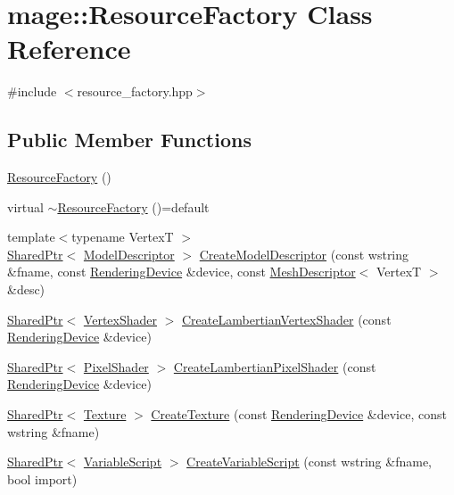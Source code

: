 \hypertarget{classmage_1_1_resource_factory}{}\section{mage\+:\+:Resource\+Factory Class Reference}
\label{classmage_1_1_resource_factory}


{\ttfamily \#include $<$resource\+\_\+factory.\+hpp$>$}

\subsection*{Public Member Functions}
\begin{DoxyCompactItemize}
\item 
\hyperlink{classmage_1_1_resource_factory_a340bde81096427e319b60063ae771a0d}{Resource\+Factory} ()
\item 
virtual \hyperlink{classmage_1_1_resource_factory_a07b50ac86226772e3c7d119ff9e10043}{$\sim$\+Resource\+Factory} ()=default
\item 
{\footnotesize template$<$typename VertexT $>$ }\\\hyperlink{namespacemage_a1e01ae66713838a7a67d30e44c67703e}{Shared\+Ptr}$<$ \hyperlink{classmage_1_1_model_descriptor}{Model\+Descriptor} $>$ \hyperlink{classmage_1_1_resource_factory_a04e226be9c659dc33d263dc82a2a1a30}{Create\+Model\+Descriptor} (const wstring \&fname, const \hyperlink{classmage_1_1_rendering_device}{Rendering\+Device} \&device, const \hyperlink{structmage_1_1_mesh_descriptor}{Mesh\+Descriptor}$<$ VertexT $>$ \&desc)
\item 
\hyperlink{namespacemage_a1e01ae66713838a7a67d30e44c67703e}{Shared\+Ptr}$<$ \hyperlink{classmage_1_1_vertex_shader}{Vertex\+Shader} $>$ \hyperlink{classmage_1_1_resource_factory_af5771b81adf517c1ff174252994e02b9}{Create\+Lambertian\+Vertex\+Shader} (const \hyperlink{classmage_1_1_rendering_device}{Rendering\+Device} \&device)
\item 
\hyperlink{namespacemage_a1e01ae66713838a7a67d30e44c67703e}{Shared\+Ptr}$<$ \hyperlink{classmage_1_1_pixel_shader}{Pixel\+Shader} $>$ \hyperlink{classmage_1_1_resource_factory_aa547e0dac336a2ac48eb92d399d929be}{Create\+Lambertian\+Pixel\+Shader} (const \hyperlink{classmage_1_1_rendering_device}{Rendering\+Device} \&device)
\item 
\hyperlink{namespacemage_a1e01ae66713838a7a67d30e44c67703e}{Shared\+Ptr}$<$ \hyperlink{classmage_1_1_texture}{Texture} $>$ \hyperlink{classmage_1_1_resource_factory_a82dd7f58c91625cb261fa41ddbeefaec}{Create\+Texture} (const \hyperlink{classmage_1_1_rendering_device}{Rendering\+Device} \&device, const wstring \&fname)
\item 
\hyperlink{namespacemage_a1e01ae66713838a7a67d30e44c67703e}{Shared\+Ptr}$<$ \hyperlink{classmage_1_1_variable_script}{Variable\+Script} $>$ \hyperlink{classmage_1_1_resource_factory_a523e3f76a3d8347f6d75a7b87a291b1e}{Create\+Variable\+Script} (const wstring \&fname, bool import)
\end{DoxyCompactItemize}
